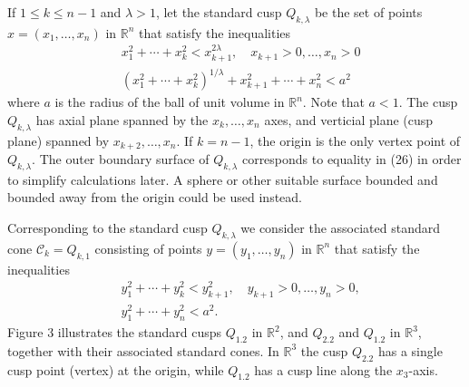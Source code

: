 \begin{para}
  If $1 \leq k \leq n-1$ and $\lambda>1$, let the standard cusp $Q_{k, \lambda}$ be the set of points $x=\left(x_1, \ldots, x_n\right)$ in $\mathbb{R}^n$ that satisfy the inequalities
  \[
  \begin{aligned}
  & x_1^2+\cdots+x_k^2<x_{k+1}^{2 \lambda}, \quad x_{k+1}>0, \ldots, x_n>0 \\
  & \left(x_1^2+\cdots+x_k^2\right)^{1 / \lambda}+x_{k+1}^2+\cdots+x_n^2<a^2
  \end{aligned}
  \]
  where $a$ is the radius of the ball of unit volume in $\mathbb{R}^n$. Note that $a<1$. The cusp $Q_{k, \lambda}$ has axial plane spanned by the $x_k, \ldots, x_n$ axes, and verticial plane (cusp plane) spanned by $x_{k+2}, \ldots, x_n$. If $k=n-1$, the origin is the only vertex point of $Q_{k, \lambda}$. The outer boundary surface of $Q_{k, \lambda}$ corresponds to equality in (26) in order to simplify calculations later. A sphere or other suitable surface bounded and bounded away from the origin could be used instead.
  
  Corresponding to the standard cusp $Q_{k, \lambda}$ we consider the associated standard cone $\mathcal{C}_k=Q_{k, 1}$ consisting of points $y=\left(y_1, \ldots, y_n\right)$ in $\mathbb{R}^n$ that satisfy the inequalities
  \[
  \begin{aligned}
  & y_1^2+\cdots+y_k^2<y_{k+1}^2, \quad y_{k+1}>0, \ldots, y_n>0, \\
  & y_1^2+\cdots+y_n^2<a^2 .
  \end{aligned}
  \]
  Figure 3 illustrates the standard cusps $Q_{1.2}$ in $\mathbb{R}^2$, and $Q_{2.2}$ and $Q_{1.2}$ in $\mathbb{R}^3$, together with their associated standard cones. In $\mathbb{R}^3$ the cusp $Q_{2.2}$ has a single cusp point (vertex) at the origin, while $Q_{1.2}$ has a cusp line along the $x_3$-axis.
  

\end{para}
